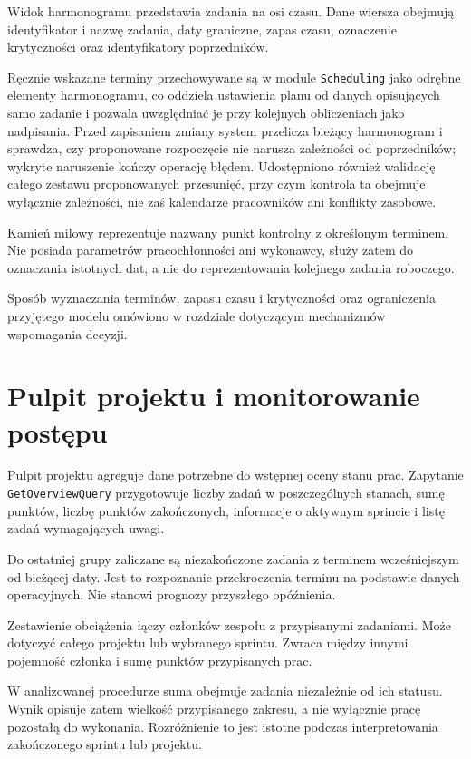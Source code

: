 Widok harmonogramu przedstawia zadania na osi czasu. Dane wiersza obejmują identyfikator i nazwę zadania, daty graniczne, zapas czasu, oznaczenie krytyczności oraz identyfikatory poprzedników.

Ręcznie wskazane terminy przechowywane są w module \texttt{Scheduling} jako odrębne elementy harmonogramu, co oddziela ustawienia planu od danych opisujących samo zadanie i pozwala uwzględniać je przy kolejnych obliczeniach jako nadpisania. Przed zapisaniem zmiany system przelicza bieżący harmonogram i sprawdza, czy proponowane rozpoczęcie nie narusza zależności od poprzedników; wykryte naruszenie kończy operację błędem. Udostępniono również walidację całego zestawu proponowanych przesunięć, przy czym kontrola ta obejmuje wyłącznie zależności, nie zaś kalendarze pracowników ani konflikty zasobowe.

Kamień milowy reprezentuje nazwany punkt kontrolny z określonym terminem. Nie posiada parametrów pracochłonności ani wykonawcy, służy zatem do oznaczania istotnych dat, a nie do reprezentowania kolejnego zadania roboczego.

Sposób wyznaczania terminów, zapasu czasu i krytyczności oraz ograniczenia przyjętego modelu omówiono w rozdziale dotyczącym mechanizmów wspomagania decyzji.

\section{Pulpit projektu i monitorowanie postępu}

Pulpit projektu agreguje dane potrzebne do wstępnej oceny stanu prac. Zapytanie \texttt{GetOverviewQuery} przygotowuje liczby zadań w poszczególnych stanach, sumę punktów, liczbę punktów zakończonych, informacje o aktywnym sprincie i listę zadań wymagających uwagi.

Do ostatniej grupy zaliczane są niezakończone zadania z terminem wcześniejszym od bieżącej daty. Jest to rozpoznanie przekroczenia terminu na podstawie danych operacyjnych. Nie stanowi prognozy przyszłego opóźnienia.

Zestawienie obciążenia łączy członków zespołu z przypisanymi zadaniami. Może dotyczyć całego projektu lub wybranego sprintu. Zwraca między innymi pojemność członka i sumę punktów przypisanych prac.

W analizowanej procedurze suma obejmuje zadania niezależnie od ich statusu. Wynik opisuje zatem wielkość przypisanego zakresu, a nie wyłącznie pracę pozostałą do wykonania. Rozróżnienie to jest istotne podczas interpretowania zakończonego sprintu lub projektu.

